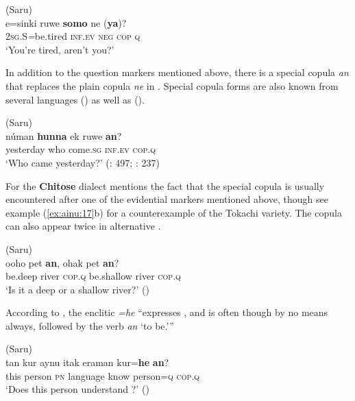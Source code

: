 \ea%
    \label{ex:ainu:9}
     (Saru)\\
    \gll e=sinki    ruwe \textbf{somo}  ne (\textbf{{ya}})?\\
    2\textsc{sg}.S\textit{=}be.tired   \textsc{inf.ev}  \textsc{neg}  \textsc{cop}  \textsc{q}\\
    \glt ‘You’re tired, aren’t you?’ \citep[233]{Tamura2000}
    \z

In addition to the question markers mentioned above, there is a special copula \textit{an} that replaces the plain copula \textit{ne} in . Special  copula forms are also known from several  languages () as well as  ().

\ea%
    \label{ex:ainu:10}
     (Saru)\\
    \gll núman \textbf{{hunna}} ek    ruwe \textbf{{an}}?\\
    yesterday  who    come.\textsc{sg}  \textsc{inf.ev}  \textsc{cop}.\textsc{q}\\
    \glt ‘Who came yesterday?’ (\citealt{Bugaeva2012}: 497; \citealt{Tamura2000}: 237)
    \z

For the \textbf{Chitose} dialect \citet[88]{Bugaeva2004} mentions the fact that the special copula is usually encountered after one of the evidential markers mentioned above, though see example (\ref{ex:ainu:17}b) for a counterexample of the Tokachi variety. The copula can also appear twice in alternative .

\ea%
    \label{ex:ainu:11}
     (Saru)\\
    \gll ooho    pet \textbf{{an}},  ohak    pet \textbf{{an}}?\\
    be.deep  river  \textsc{cop}.\textsc{q}  be.shallow  river  \textsc{cop}.\textsc{q}\\
    \glt ‘Is it a deep or a shallow river?’ (\citealt{NINJAL2015})
    \z

According to \citet[141]{Batchelor1905}, the enclitic \textit{=he} “expresses , and is often though by no means always, followed by the verb \textit{an} ‘to be.’”

\ea%
    \label{ex:ainu:12}
     (Saru)\\
    \gll tan  kur  aynu  itak    eraman  kur=\textbf{{he}} \textbf{{an}}?\\
    this  person  \textsc{pn}  language  know    person=\textsc{q}  \textsc{cop}.\textsc{q}\\
    \glt ‘Does this person understand ?’ (\citealt{NINJAL2015})
    \z

